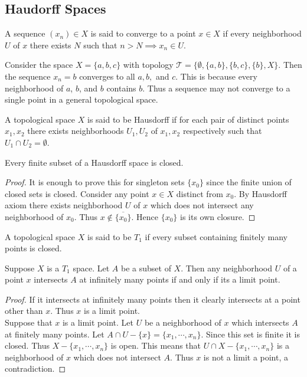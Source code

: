 \subsection{Haudorff Spaces}
\begin{definition}
  A sequence $(x_n)\in X$ is said to converge to a point $x\in X$ if every neighborhood $U$ of $x$ there exists $N$ such that $n>N \implies x_n\in U$.
\end{definition}
\begin{example}
  Consider the space $X = \{a,b,c\}$ with topology $ \mathscr{T}= \{\emptyset, \{a,b\}, \{b,c\}, \{b\}, X\}$. Then the sequence $x_n = b$ converges to all $a,b,$ and $c$. This is because every neighborhood of $a$, $b$, and $b$ contains $b$. Thus a sequence may not converge to a single point in a general topological space.
\end{example}
\begin{definition}
  A topological space $X$ is said to be Hausdorff if for each pair of distinct points $x_1,x_2$ there exists neighborhoods $U_1, U_2$ of $x_1,x_2$ respectively such that $U_1\cap U_2 = \emptyset$.
\end{definition}
\begin{theorem}
  Every finite subset of a Hausdorff space is closed.
\end{theorem}
\begin{proof}
  It is enough to prove this for singleton sets $\{x_0\}$ since the finite union of closed sets is closed. Consider any point $x\in X$ distinct from $x_0$. By Hausdorff axiom there exists neighborhood $U$ of $x$ which does not intersect any neighborhood of $x_0$. Thus $x\notin \overline{\{x_0\}}$. Hence $\{x_0\}$ is its own closure.
\end{proof}
\begin{definition}
  A topological space $X$ is said to be $T_1$ if every subset containing finitely many points is closed.
\end{definition}
\begin{theorem}
  Suppose $X$ is a $T_1$ space. Let $A$ be a subset of $X$. Then any neighborhood $U$ of a point $x$ intersects $A$ at infinitely many points if and only if its a limit point.
\end{theorem}
\begin{proof}
  If it intersects at infinitely many points then it clearly intersects at a point other than $x$. Thus $x$ is a limit point.\\

  Suppose that $x$ is a limit point. Let $U$ be a neighborhood of $x$ which intersects $A$ at finitely many points. Let $A\cap U-\{x\} = \{x_1, \cdots, x_n\}$. Since this set is finite it is closed. Thus $X-\{x_1,\cdots, x_n\}$ is open. This means that $U\cap X-\{x_1,\cdots, x_n\}$ is a neighborhood of $x$ which does not intersect $A$. Thus $x$ is not a limit a point, a contradiction.
\end{proof}
